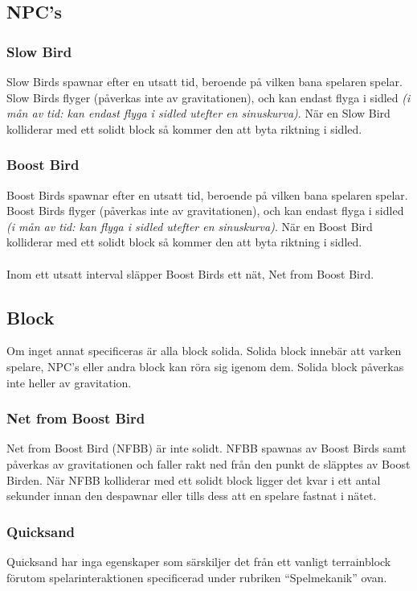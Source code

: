 \documentclass{TDP003mall}
\begin{document}
\subsection{NPC's}
\subsubsection{Slow Bird}
Slow Birds spawnar efter en utsatt tid, beroende på vilken bana spelaren spelar. Slow Birds flyger (påverkas inte av gravitationen), och kan endast flyga i sidled \textit{(i mån av tid: kan endast flyga i sidled utefter en sinuskurva)}. När en Slow Bird kolliderar med ett solidt block så kommer den att byta riktning i sidled.

\subsubsection{Boost Bird}
Boost Birds spawnar efter en utsatt tid, beroende på vilken bana spelaren spelar. Boost Birds flyger (påverkas inte av gravitationen), och kan endast flyga i sidled \textit{(i mån av tid: kan flyga i sidled utefter en sinuskurva)}. När en Boost Bird kolliderar med ett solidt block så kommer den att byta riktning i sidled. \\\\
Inom ett utsatt interval släpper Boost Birds ett nät, Net from Boost Bird.

\subsection{Block}
Om inget annat specificeras är alla block solida. Solida block innebär att varken spelare, NPC's eller andra block kan röra sig igenom dem. Solida block påverkas inte heller av gravitation.

\subsubsection{Net from Boost Bird}
Net from Boost Bird (NFBB) är inte solidt. NFBB spawnas av Boost Birds samt påverkas av gravitationen och faller rakt ned från den punkt de släpptes av Boost Birden. När NFBB kolliderar med ett solidt block ligger det kvar i ett antal sekunder innan den despawnar eller tills dess att en spelare fastnat i nätet.

\subsubsection{Quicksand}
Quicksand har inga egenskaper som särskiljer det från ett vanligt terrainblock förutom spelarinteraktionen specificerad under rubriken ``Spelmekanik'' ovan.
\end{document}
